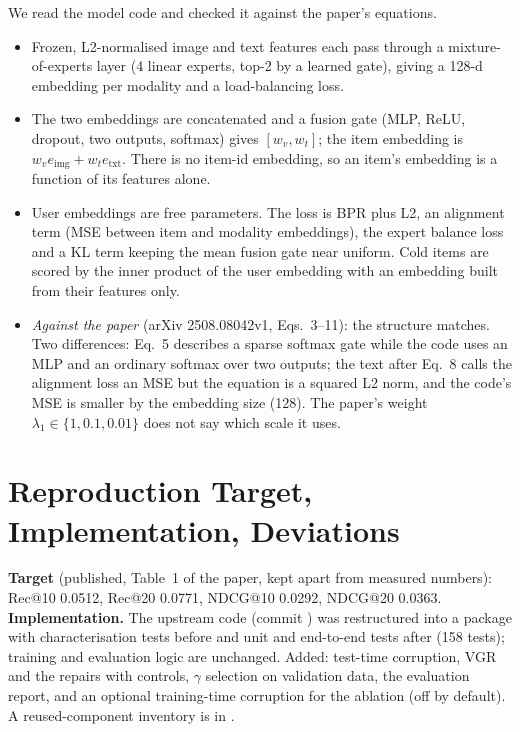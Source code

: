 \documentclass[conference]{IEEEtran}
\newcommand{\code}[1]{\texttt{\detokenize{#1}}}
\begin{document}
We read the model code and checked it against the paper's equations.
\begin{itemize}
\item Frozen, L2-normalised image and text features each pass through a mixture-of-experts layer (4 linear experts, top-2 by a learned gate), giving a 128-d embedding per modality and a load-balancing loss.
\item The two embeddings are concatenated and a fusion gate (MLP, ReLU, dropout, two outputs, softmax) gives $[w_v, w_t]$; the item embedding is $w_v e_{\text{img}} + w_t e_{\text{txt}}$. There is no item-id embedding, so an item's embedding is a function of its features alone.
\item User embeddings are free parameters. The loss is BPR plus L2, an alignment term (MSE between item and modality embeddings), the expert balance loss and a KL term keeping the mean fusion gate near uniform. Cold items are scored by the inner product of the user embedding with an embedding built from their features only.
\item \emph{Against the paper} (arXiv 2508.08042v1, Eqs.~3--11): the structure matches. Two differences: Eq.~5 describes a sparse softmax gate while the code uses an MLP and an ordinary softmax over two outputs; the text after Eq.~8 calls the alignment loss an MSE but the equation is a squared L2 norm, and the code's MSE is smaller by the embedding size (128). The paper's weight $\lambda_1 \in \{1, 0.1, 0.01\}$ does not say which scale it uses.
\end{itemize}

\section{Reproduction Target, Implementation, Deviations}
\label{sec:repro}

\textbf{Target} (published, Table~1 of the paper, kept apart from measured numbers): Rec@10 0.0512, Rec@20 0.0771, NDCG@10 0.0292, NDCG@20 0.0363. \textbf{Implementation.} The upstream code (commit \code{88a932e}) was restructured into a package with characterisation tests before and unit and end-to-end tests after (158 tests); training and evaluation logic are unchanged. Added: test-time corruption, VGR and the repairs with controls, $\gamma$ selection on validation data, the evaluation report, and an optional training-time corruption for the ablation (off by default). A reused-component inventory is in \code{docs/reused_components.md}.
\end{document}
